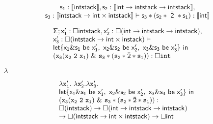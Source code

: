 \documentclass[10pt]{book}
\begin{document}
\begin{mdSnippets}
\begin{mdDisplaySnippet}
\[%
\begin{array}{c}
{\sf s_1:\llbracket intstack\rrbracket,  s_2:\llbracket int\rightarrow intstack\rightarrow intstack\rrbracket},\\
{\sf s_3:\llbracket intstack\rightarrow int\times intstack \rrbracket \vdash   s_3 * (s_2 * \ \bar{2}\ * s_1):\llbracket int\rrbracket} 
\end{array}
\]%
\end{mdDisplaySnippet}%
\begin{mdDisplaySnippet}[b93d6314eb77d05be08e548d9f9974c3]%
\[%
\begin{array}{l}
{\sf \Sigma}; {\sf {x_1^{\prime}:\Box intstack ,x_2^{\prime}:\Box(int\rightarrow intstack\rightarrow intstack)}},\\
   {\sf x_3^{\prime}: \Box  (intstack\rightarrow int\times instack)}\vdash \\
        {\sf  let\{ x_1\& s_1 {\ \sf be \ } x_1^{\prime},
         \ x_2\& s_2 {\ \sf be \ } x_2^{\prime}, \  x_3\& s_3 
         {\ \sf be \ } x_3^{\prime} \}\  in}\ \\   
         \mathtt{(x_3 (x_2\ 2 \ x_1)\ \& \ s_3*(s_2* \bar{2}*s_1)):\Box int} 
\end{array}
\]%
\end{mdDisplaySnippet}%
\begin{mdInlineSnippet}[c6a6eb61fd9c6c913da73b3642ca147d]%
$\lambda$\end{mdInlineSnippet}%
\begin{mdDisplaySnippet}%
\[%
\begin{array}{l l}
\mathtt{\lambda x_1^{\prime}.\  \lambda x_2^{\prime}. \lambda x_3^{\prime}}. \\
                 {\sf  let\{ x_1\& s_1 {\ \sf be \ } x_1^{\prime},
       \ x_2\& s_2 {\ \sf be \ } x_2^{\prime}, \  x_3\& s_3 
       {\ \sf be \ } x_3^{\prime} \}\  in}\ \\   
       \mathtt{(x_3 (x_2\ 2 \ x_1)\ \& \ s_3*(s_2* \bar{2}*s_1)):}\\
           {\sf \Box(intstack)\rightarrow 
            \Box(int\rightarrow intstack\rightarrow intstack)} \\
           {\sf \rightarrow \Box (intstack\rightarrow int\times intstack) \rightarrow \Box int}
\end{array}
\]%
\end{mdDisplaySnippet}%

\end{mdSnippets}
\end{document}
